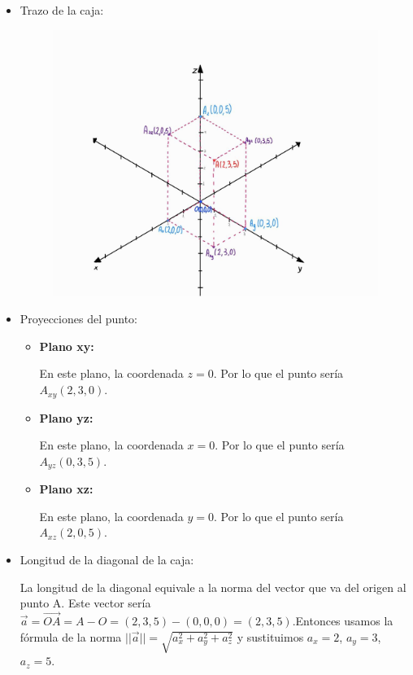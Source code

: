 \documentclass[12pt]{article}
\begin{document}
\begin{itemize}
  
\item Trazo de la caja:
  
  \begin{figure}[H]
    \centering
    \includegraphics[width=1\textwidth]{./img/caja.jpeg}
  \end{figure}
  
\item Proyecciones del punto:
  \begin{itemize}
    
  \item \textbf{Plano xy:}
    
    En este plano, la coordenada $z=0$. Por lo que el punto sería $A_{xy}(2, 3, 0)$.
    
  \item \textbf{Plano yz:}
    
    En este plano, la coordenada $x=0$. Por lo que el punto sería $A_{yz}(0, 3, 5)$.
    
  \item \textbf{Plano xz:}
    
    En este plano, la coordenada $y=0$. Por lo que el punto sería $A_{xz}(2, 0, 5)$.
    
  \end{itemize}
  
\item Longitud de la diagonal de la caja:
  
  La longitud de la diagonal equivale a la norma del vector que va del origen al punto A. Este vector sería $\vec{a} = \vec{OA} = A-O = (2, 3, 5) - (0, 0, 0) = (2,3,5)$.Entonces usamos la fórmula de la norma $||\vec{a}|| = \sqrt{a_x^2 +  a_y^2 + a_z^2}$ y sustituimos $a_x = 2$, $a_y = 3$, $a_z = 5$.
  

\end{itemize}
\end{document}

